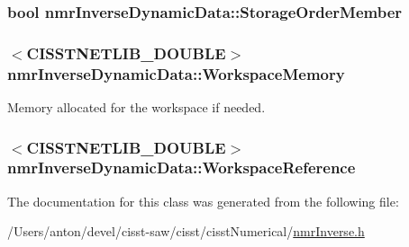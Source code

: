 \subsubsection[{Storage\+Order\+Member}]{\setlength{\rightskip}{0pt plus 5cm}bool nmr\+Inverse\+Dynamic\+Data\+::\+Storage\+Order\+Member\hspace{0.3cm}{\ttfamily [protected]}}\label{classnmr_inverse_dynamic_data_a295f57a6eaeca3374aa4e58e983ccefd}
\hypertarget{classnmr_inverse_dynamic_data_ae76c0f077fd60cafab907d5f0e20a490}{}
\subsubsection[{Workspace\+Memory}]{$<$C\+I\+S\+S\+T\+N\+E\+T\+L\+I\+B\+\_\+\+D\+O\+U\+B\+L\+E$>$ nmr\+Inverse\+Dynamic\+Data\+::\+Workspace\+Memory\hspace{0.3cm}{\ttfamily [protected]}}\label{classnmr_inverse_dynamic_data_ae76c0f077fd60cafab907d5f0e20a490}
Memory allocated for the workspace if needed. \hypertarget{classnmr_inverse_dynamic_data_a5233a5419f7da87a54abd486832b0817}{}
\subsubsection[{Workspace\+Reference}]{$<$C\+I\+S\+S\+T\+N\+E\+T\+L\+I\+B\+\_\+\+D\+O\+U\+B\+L\+E$>$ nmr\+Inverse\+Dynamic\+Data\+::\+Workspace\+Reference\hspace{0.3cm}{\ttfamily [protected]}}\label{classnmr_inverse_dynamic_data_a5233a5419f7da87a54abd486832b0817}


The documentation for this class was generated from the following file\+:\begin{DoxyCompactItemize}
\item 
/\+Users/anton/devel/cisst-\/saw/cisst/cisst\+Numerical/\hyperlink{nmr_inverse_8h}{nmr\+Inverse.\+h}\end{DoxyCompactItemize}
